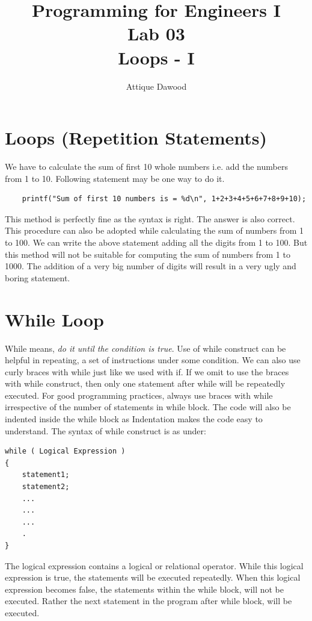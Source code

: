 \documentclass[12pt,a4paper]{article}
\title{\vspace{-2cm}Programming for Engineers I\\Lab 03\\Loops - I}
\author{Attique Dawood}
\begin{document}
\maketitle

\section{Loops (Repetition Statements)}
We have to calculate the sum of first 10 whole numbers i.e. add the numbers from 1 to 10. Following statement may be one way to do it.
\begin{verbatim}
    printf("Sum of first 10 numbers is = %d\n", 1+2+3+4+5+6+7+8+9+10);
\end{verbatim}
This method is perfectly fine as the syntax is right. The answer is also correct. This procedure can also be adopted while calculating the sum of numbers from 1 to 100. We can write the above statement adding all the digits from 1 to 100. But this method will not be suitable for computing the sum of numbers from 1 to 1000. The addition of a very big number of digits will result in a very ugly and boring statement. 

\section{While Loop}
While means, \emph{do it until the condition is true}. Use of while construct can be helpful in repeating, a set of instructions under some condition. We can also use curly braces with while just like we used with if. If we omit to use the braces with while construct, then only one statement after while will be repeatedly executed. For good programming practices, always use braces with while irrespective of the number of statements in while block. The code will also be indented inside the while block as Indentation makes the code easy to understand. 
The syntax of while construct is as under:
\begin{verbatim}
while ( Logical Expression )
{
    statement1;
    statement2;
    ...
    ...
    ...
    .
}
\end{verbatim}
The logical expression contains a logical or relational operator. While this logical expression is true, the statements will be executed repeatedly. When this logical expression becomes false, the statements within the while block, will not be executed. Rather the next statement in the program after while block, will be executed. 
\end{document}
